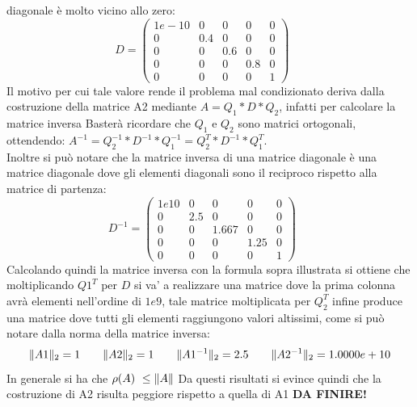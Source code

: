 \documentclass[12pt]{article}
\begin{document}
\begin{enumerate}
    diagonale è molto vicino allo zero:
    \begin{equation*} D=
        \begin{pmatrix}
            1e-10 & 0 & 0 & 0 & 0 \\
            0 & 0.4 & 0 & 0 & 0 \\
            0 & 0 & 0.6 & 0 & 0 \\
            0 & 0 & 0 & 0.8 & 0 \\
            0 & 0 & 0 & 0 & 1
        \end{pmatrix}\;\;\;\;\;
    \end{equation*}
    Il motivo per cui tale valore rende il problema mal condizionato deriva dalla costruzione della matrice A2 mediante \(A=Q_1 * D * Q_2\), infatti per calcolare la matrice inversa Basterà ricordare che \(Q_1\) e \(Q_2\) sono matrici ortogonali, ottendendo:
    \(A^{-1}=Q_2^{-1} * D^{-1} * Q_1^{-1} = Q_2^{T} * D^{-1} * Q_1^{T}\).\\
    Inoltre si può notare che la matrice inversa di una matrice diagonale è una matrice diagonale dove gli elementi diagonali sono il reciproco rispetto alla matrice di partenza:
    \begin{equation*} D^{-1}=
        \begin{pmatrix}
            1e10 & 0 & 0 & 0 & 0 \\
            0 & 2.5 & 0 & 0 & 0 \\
            0 & 0 & 1.667 & 0 & 0 \\
            0 & 0 & 0 & 1.25 & 0 \\
            0 & 0 & 0 & 0 & 1
        \end{pmatrix}\;\;\;\;\;
    \end{equation*}
    Calcolando quindi la matrice inversa con la formula sopra illustrata si ottiene che 
    moltiplicando \(Q1^{T}\) per \(D\) si va' a realizzare una matrice dove la prima colonna avrà elementi nell'ordine di \(1e9\), 
    tale matrice moltiplicata per \(Q_2^{T}\) infine produce una matrice dove tutti gli elementi 
    raggiungono valori altissimi, come si può notare dalla norma della matrice inversa:
    \begin{equation*}
    \Arrowvert A1 \Arrowvert_{2}=1 \qquad
    \Arrowvert A2 \Arrowvert_{2}=1 \qquad
    \Arrowvert A1^{-1} \Arrowvert_{2}=2.5 \qquad
    \Arrowvert A2^{-1} \Arrowvert_{2}=1.0000e+10
    \end{equation*}
    In generale si ha che \(\rho(A)\ \le \Arrowvert A \Arrowvert\)
    Da questi risultati si evince quindi che la costruzione di A2 risulta peggiore rispetto a quella di A1
    \textbf{DA FINIRE!}
\end{enumerate}
\end{document}
